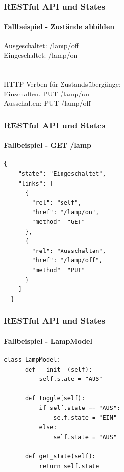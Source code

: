\begin{frame}
  \frametitle{RESTful API und States}
  \framesubtitle{Fallbeispiel - Zustände abbilden}
    Ausgeschaltet: /lamp/off\\
    Eingeschaltet: /lamp/on\\
    \\\\
    HTTP-Verben für Zustandsübergänge:
    \\
    Einschalten: PUT /lamp/on\\
    Ausschalten: PUT /lamp/off
\end{frame}


\begin{frame}[fragile]
  \frametitle{RESTful API und States}
  \framesubtitle{Fallbeispiel - GET /lamp}
  \begin{minipage}{\textwidth}
  \begin{lstlisting}[caption={Fallbeispiel REST - an},captionpos=b,label={lst:rest_an}]
  {
    "state": "Eingeschaltet",
    "links": [
      {
        "rel": "self",
        "href": "/lamp/on",
        "method": "GET"
      },
      {
        "rel": "Ausschalten",
        "href": "/lamp/off",
        "method": "PUT"
      }
    ]
  }
  \end{lstlisting}
  \end{minipage}
\end{frame}

\begin{frame}[fragile]
  \frametitle{RESTful API und States}
  \framesubtitle{Fallbeispiel - LampModel}
  \begin{minipage}{\textwidth}
  \begin{lstlisting}[caption={LampModel},captionpos=b,label={lst:lamp_m}]
  class LampModel:
      def __init__(self):
          self.state = "AUS"

      def toggle(self):
          if self.state == "AUS":
              self.state = "EIN"
          else:
              self.state = "AUS"

      def get_state(self):
          return self.state

  \end{lstlisting}
  \end{minipage}
\end{frame}


